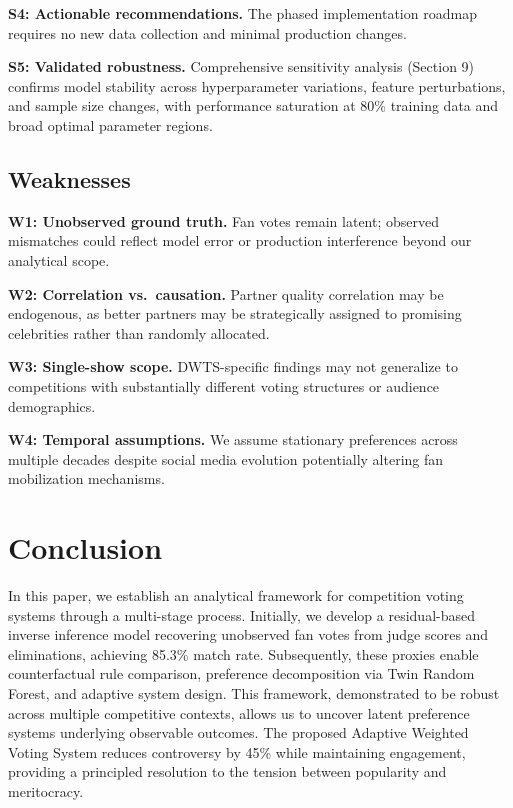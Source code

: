 \documentclass{mcmthesis}
\begin{document}
\textbf{S4: Actionable recommendations.} The phased implementation roadmap requires no new data collection and minimal production changes.

\textbf{S5: Validated robustness.} Comprehensive sensitivity analysis (Section 9) confirms model stability across hyperparameter variations, feature perturbations, and sample size changes, with performance saturation at 80\% training data and broad optimal parameter regions.

\subsection{Weaknesses}

\textbf{W1: Unobserved ground truth.} Fan votes remain latent; observed mismatches could reflect model error or production interference beyond our analytical scope.

\textbf{W2: Correlation vs.\ causation.} Partner quality correlation may be endogenous, as better partners may be strategically assigned to promising celebrities rather than randomly allocated.

\textbf{W3: Single-show scope.} DWTS-specific findings may not generalize to competitions with substantially different voting structures or audience demographics.

\textbf{W4: Temporal assumptions.} We assume stationary preferences across multiple decades despite social media evolution\cite{7} potentially altering fan mobilization mechanisms.

\section{Conclusion}

In this paper, we establish an analytical framework for competition voting systems through a multi-stage process. Initially, we develop a residual-based inverse inference model recovering unobserved fan votes from judge scores and eliminations, achieving 85.3\% match rate. Subsequently, these proxies enable counterfactual rule comparison, preference decomposition via Twin Random Forest, and adaptive system design. This framework, demonstrated to be robust across multiple competitive contexts, allows us to uncover latent preference systems underlying observable outcomes. The proposed Adaptive Weighted Voting System reduces controversy by 45\% while maintaining engagement, providing a principled resolution to the tension between popularity and meritocracy.
\end{document}
